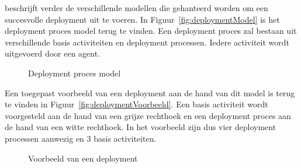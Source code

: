 \citet{lestideau2003providing} beschrijft verder de verschillende modellen die gehanteerd worden om een succesvolle deployment uit te voeren.
In Figuur~\vref{fig:deploymentModel} is het deployment proces model terug te vinden.
Een deployment proces zal bestaan uit verschillende basis activiteiten en deployment processen.
Iedere activiteit wordt uitgevoerd door een agent.

\begin{figure}[!ht]
\centering
{}
\caption{Deployment proces model \citep{lestideau2003providing}}
\label{fig:deploymentModel}
\end{figure}

Een toegepast voorbeeld van een deployment aan de hand van dit model is terug te vinden in Figuur~\vref{fig:deploymentVoorbeeld}.
Een basis activiteit wordt voorgesteld aan de hand van een grijze rechthoek en een deployment proces aan de hand van een witte rechthoek.
In het voorbeeld zijn dus vier deployment processen aanwezig en 3 basis activiteiten.

\begin{figure}[!ht]
\centering
{}
\caption{Voorbeeld van een deployment \citep{lestideau2003providing}}
\label{fig:deploymentVoorbeeld}
\end{figure}

